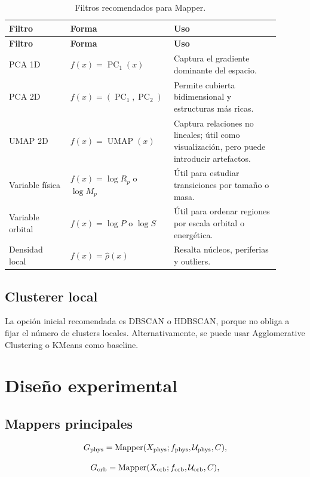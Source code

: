 \documentclass[11pt,letterpaper]{article}
\newcommand{\Rp}{R_p}
\newcommand{\Mp}{M_p}
\newcommand{\Mapper}{\operatorname{Mapper}}
\newcommand{\phys}{\rm phys}
\newcommand{\orb}{\rm orb}
\begin{document}
\begin{longtable}{p{0.22\linewidth}p{0.30\linewidth}p{0.38\linewidth}}
\caption{Filtros recomendados para Mapper.}\\
\toprule
\textbf{Filtro} & \textbf{Forma} & \textbf{Uso} \\
\midrule
\endfirsthead
\toprule
\textbf{Filtro} & \textbf{Forma} & \textbf{Uso} \\
\midrule
\endhead
PCA 1D & $f(x)=\operatorname{PC}_1(x)$ & Captura el gradiente dominante del espacio. \\
PCA 2D & $f(x)=(\operatorname{PC}_1,\operatorname{PC}_2)$ & Permite cubierta bidimensional y estructuras más ricas. \\
UMAP 2D & $f(x)=\operatorname{UMAP}(x)$ & Captura relaciones no lineales; útil como visualización, pero puede introducir artefactos. \\
Variable física & $f(x)=\log \Rp$ o $\log\Mp$ & Útil para estudiar transiciones por tamaño o masa. \\
Variable orbital & $f(x)=\log P$ o $\log S$ & Útil para ordenar regiones por escala orbital o energética. \\
Densidad local & $f(x)=\widehat{\rho}(x)$ & Resalta núcleos, periferias y outliers. \\
\bottomrule
\end{longtable}

\subsection{Clusterer local}

La opción inicial recomendada es DBSCAN o HDBSCAN, porque no obliga a fijar el número de clusters locales. Alternativamente, se puede usar Agglomerative Clustering o KMeans como baseline.

\section{Diseño experimental}

\subsection{Mappers principales}

\begin{equation}
G_{\phys}=\Mapper(X_{\phys};f_{\phys},\mathcal{U}_{\phys},C),
\end{equation}

\begin{equation}
G_{\orb}=\Mapper(X_{\orb};f_{\orb},\mathcal{U}_{\orb},C),
\end{equation}
\end{document}
